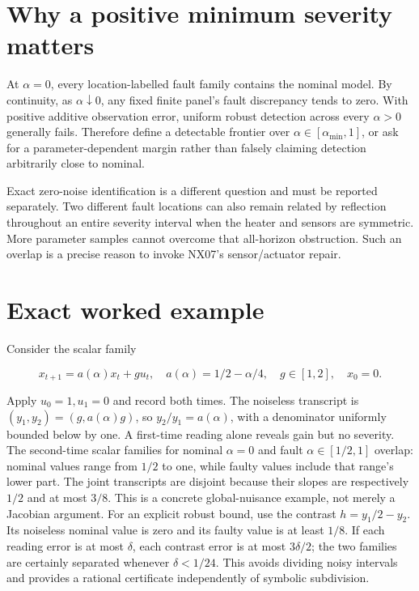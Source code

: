 \documentclass[
  11pt,
  a4paper,
]{report}
\begin{document}
\hypertarget{why-a-positive-minimum-severity-matters}{%
\section{Why a positive minimum severity
matters}\label{why-a-positive-minimum-severity-matters}}

At \(\alpha=0\), every location-labelled fault family contains the
nominal model. By continuity, as \(\alpha\downarrow0\), any fixed finite
panel's fault discrepancy tends to zero. With positive additive
observation error, uniform robust detection across every \(\alpha>0\)
generally fails. Therefore define a detectable frontier over
\(\alpha\in[\alpha_{\min},1]\), or ask for a parameter-dependent margin
rather than falsely claiming detection arbitrarily close to nominal.

Exact zero-noise identification is a different question and must be
reported separately. Two different fault locations can also remain
related by reflection throughout an entire severity interval when the
heater and sensors are symmetric. More parameter samples cannot overcome
that all-horizon obstruction. Such an overlap is a precise reason to
invoke NX07's sensor/actuator repair.

\hypertarget{exact-worked-example-3}{%
\section{Exact worked example}\label{exact-worked-example-3}}

Consider the scalar family

\[
x_{t+1}=a(\alpha)x_t+gu_t,\quad
 a(\alpha)=1/2-\alpha/4,\quad g\in[1,2],\quad x_0=0.
\]

Apply \(u_0=1,u_1=0\) and record both times. The noiseless transcript is
\((y_1,y_2)=(g,a(\alpha)g)\), so \(y_2/y_1=a(\alpha)\), with a
denominator uniformly bounded below by one. A first-time reading alone
reveals gain but no severity. The second-time scalar families for
nominal \(\alpha=0\) and fault \(\alpha\in[1/2,1]\) overlap: nominal
values range from \(1/2\) to one, while faulty values include that
range's lower part. The joint transcripts are disjoint because their
slopes are respectively \(1/2\) and at most \(3/8\). This is a concrete
global-nuisance example, not merely a Jacobian argument. For an explicit
robust bound, use the contrast \(h=y_1/2-y_2\). Its noiseless nominal
value is zero and its faulty value is at least \(1/8\). If each reading
error is at most \(\delta\), each contrast error is at most
\(3\delta/2\); the two families are certainly separated whenever
\(\delta<1/24\). This avoids dividing noisy intervals and provides a
rational certificate independently of symbolic subdivision.
\end{document}
